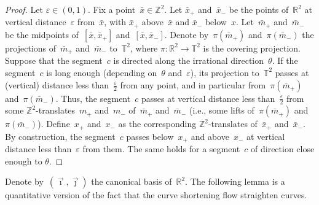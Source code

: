 \documentclass[AHL,Unicode,longabstracts,published]{cedram}
\newcommand{\Z}{\mathbb{Z}}
\newcommand{\R}{\mathbb{R}}
\newcommand{\T}{\mathbb{T}}
\newcommand{\ie}{i.e.}
\begin{document}
\begin{proof}
Let $\varepsilon \in (0,1)$. Fix a point~$\bar{x} \in \Z^2$. Let $\bar{x}_+$ and~$\bar{x}_-$ be the points of~$\R^2$ at vertical distance~$\varepsilon$ from~$\bar{x}$, with $\bar{x}_+$ above~$\bar{x}$ and $\bar{x}_-$ below~$x$. Let~$\bar{m}_+$ and~$\bar{m}_-$ be the midpoints of~$[\bar{x},\bar{x}_+]$ and~$[\bar{x},\bar{x}_-]$. Denote by~$\pi(\bar{m}_+)$ and~$\pi(\bar{m}_-)$ the projections of~$\bar{m}_+$ and~$\bar{m}_-$ to~$\T^2$, where $\pi:\R^2 \to \T^2$ is the covering projection. Suppose that the segment~$c$ is directed along the irrational direction~$\theta$. If the segment~$c$ is long enough (depending on~$\theta$ and~$\varepsilon$), its projection to~$\T^2$ passes at (vertical) distance less than~$\frac{\varepsilon}{2}$ from any point, and in particular from~$\pi(\bar{m}_+)$ and~$\pi(\bar{m}_-)$. Thus, the segment~$c$ passes at vertical distance less than~$\frac{\varepsilon}{2}$ from some $\Z^2$-translates~$m_+$ and~$m_-$ of~$\bar{m}_+$ and~$\bar{m}_-$ (\ie, some lifts of~$\pi(\bar{m}_+)$ and~$\pi(\bar{m}_-)$). Define~$x_+$ and~$x_-$ as the corresponding $\Z^2$-translates of~$\bar{x}_+$ and~$\bar{x}_-$. By construction, the segment~$c$ passes below~$x_+$ and above~$x_-$ at vertical distance less than~$\varepsilon$ from them. The same holds for a segment~$c$ of direction close enough to $\theta$.
\end{proof}

Denote by~$(\vec{\imath},\vec{\jmath})$ the canonical basis of~$\R^2$. The following lemma is a quantitative version of the fact that the curve shortening flow straighten curves.

\end{document}
